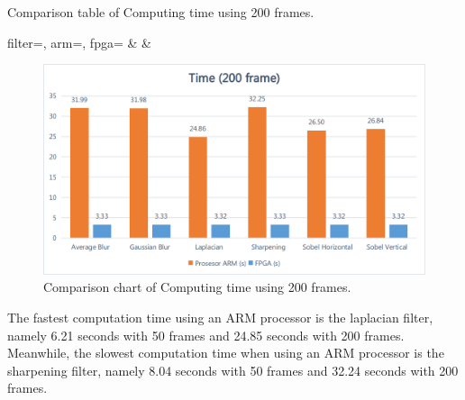 \begin{atable}
    \caption{Comparison table of Computing time using 200 frames.}
    \label{table:hasil-time200}
        {
            filter=\filter, 
            arm=\arm, 
            fpga=\fpga}
        {
            \filter & 
            \arm & 
            \fpga }
\end{atable}

\begin{figure}[ht]
    \centering
    \includegraphics[width=0.81\linewidth, center]{images/chart/chart-time200.png}
    \caption{Comparison chart of Computing time using 200 frames.}
    \label{fig:chart-time200}
\end{figure}


The fastest computation time using an ARM processor is the laplacian filter, namely 6.21 seconds with 50 frames and 24.85 seconds with 200 frames. Meanwhile, the slowest computation time when using an ARM processor is the sharpening filter, namely 8.04 seconds with 50 frames and 32.24 seconds with 200 frames.


